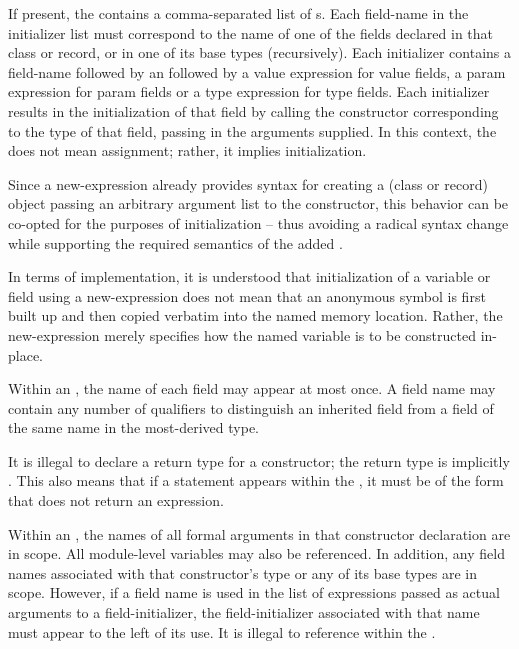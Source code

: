 If present, the  contains a comma-separated list of
s.  Each field-name in the initializer list must correspond to the name
of one of the fields declared in that class or record, or in one of its base types
(recursively).  Each initializer contains a field-name followed by an
\chpl{=} followed by a value expression for value fields, a param expression for param fields or a type expression for type fields.
Each initializer results in the initialization of that field by
calling the constructor corresponding to the type of that field, passing in the arguments
supplied.  In this context, the \chpl{=} does not mean assignment; rather, it implies
initialization.

\begin{rationale}
Since a new-expression already provides syntax for creating a (class or record) object
passing an arbitrary argument list to the constructor, this behavior can be co-opted for
the purposes of initialization -- thus avoiding a radical syntax change while supporting
the required semantics of the added .  

In terms of implementation, it is understood that initialization of a variable or field
using a new-expression does not mean that an anonymous symbol is first built up and then
copied verbatim into the named memory location.  Rather, the new-expression merely
specifies how the named variable is to be constructed in-place.
\end{rationale}

Within an , the name of each field may appear at most
once.  A field name may contain any number of  qualifiers to distinguish an
inherited field from a field of the same name in the most-derived type.

It is illegal to declare a return type for a constructor; the return type is
implicitly .  This also means that if a  statement
appears within the , it must be of the form that does not
return an expression.

Within an , the names of all formal arguments in that constructor
declaration are in scope.  All module-level variables may also be referenced.  In
addition, any field names associated with that constructor's type or any of its base types
are in scope.  However, if a field name is used in the list of expressions passed as
actual arguments to a field-initializer, the field-initializer associated with that name
must appear to the left of its use.  It is illegal to reference  within the
.


